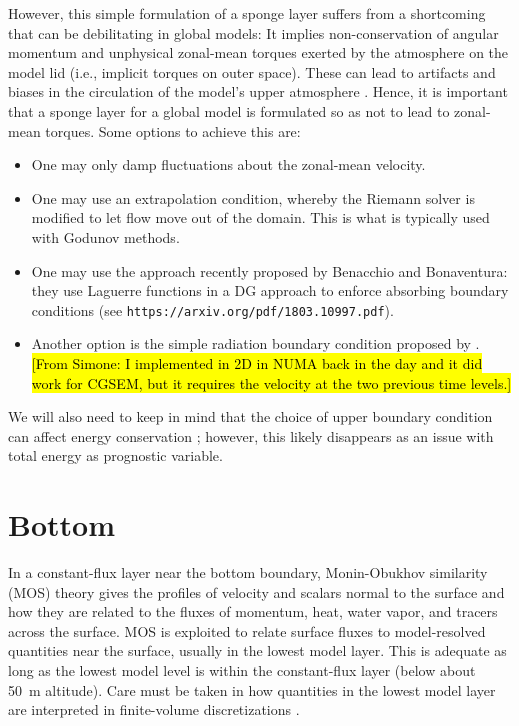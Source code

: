 \documentclass{report}
\begin{document}
However, this simple formulation of a sponge layer suffers from a shortcoming that can be debilitating in global models: It implies non-conservation of angular momentum and unphysical zonal-mean torques exerted by the atmosphere on the model lid (i.e., implicit torques on outer space). These can lead to artifacts and biases in the circulation of the model's upper atmosphere \citep[e.g.,][]{Shepherd96a}. Hence, it is important that a sponge layer for a global model is formulated so as not to lead to zonal-mean torques. Some options to achieve this are:
\begin{itemize}
    \item One may only damp fluctuations about the zonal-mean velocity.  
    \item One may use an extrapolation condition, whereby the Riemann solver is modified to let flow move out of the domain. This is what is typically used with Godunov methods. 
    \item One may use the approach recently proposed by Benacchio and Bonaventura: they use Laguerre functions in a DG approach to enforce absorbing boundary conditions (see \texttt{https://arxiv.org/pdf/1803.10997.pdf}).
    \item Another option is the simple radiation boundary condition proposed by \cite{orlanski1979}. \hl{[From Simone: I implemented in 2D in NUMA back in the day and it did work for CGSEM, but it requires the velocity at the two previous time levels.]}
\end{itemize}
    
We will also need to keep in mind that the choice of upper boundary condition can affect energy conservation \citep[e.g.,][]{Staniforth03a}; however, this likely disappears as an issue with total energy as prognostic variable.

\section{Bottom} 
\label{s:bottom_bc}
In a constant-flux layer near the bottom boundary, Monin-Obukhov similarity (MOS) theory gives the profiles of velocity and scalars normal to the surface and how they are related to the fluxes of momentum, heat, water vapor, and tracers across the surface. MOS is exploited to relate surface fluxes to model-resolved quantities near the surface, usually in the lowest model layer. This is adequate as long as the lowest model level is within the constant-flux layer (below about 50~m altitude). Care must be taken in how quantities in the lowest model layer are interpreted in finite-volume discretizations  \citep{Nishizawa18a}.
\end{document}

